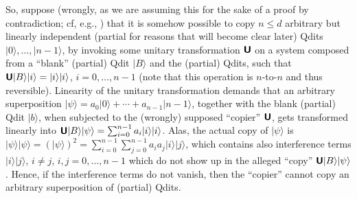 \documentclass[%
  preprint,
 showpacs,
 showkeys,
 preprintnumbers,
 amsmath,amssymb,
 aps,
   pra,
  longbibliography,
 ]{revtex4-1}
\begin{document}
So, suppose (wrongly, as we are assuming this for the sake of a proof by contradiction; cf, e.g.,
\cite[pp.~39-40]{mermin-04} )
that it is somehow possible to copy $n\le d$ arbitrary but linearly independent (partial for reasons that will become clear later) Qdits
$\vert 0 \rangle , \ldots , \vert n-1 \rangle $,
by invoking some unitary transformation
$\textsf{\textbf{U}}$ on a system composed from a ``blank'' (partial) Qdit
$\vert B \rangle $ and the (partial) Qdits, such that
$\textsf{\textbf{U}}  \vert B \rangle \vert i \rangle    = \vert i \rangle \vert i \rangle $, $i=0,\ldots , n-1$
(note that this operation is $n$-to-$n$ and thus reversible).
Linearity of the unitary transformation demands that an arbitrary superposition
$\vert \psi  \rangle = a_0\vert 0 \rangle + \cdots + a_{n-1}\vert n-1 \rangle $,
together with the blank (partial) Qdit
$\vert b \rangle $,
when subjected to the (wrongly) supposed ``copier'' $\textsf{\textbf{U}}$,
gets transformed linearly into
$\textsf{\textbf{U}}  \vert B \rangle \vert \psi \rangle    = \sum_{i=0}^{n-1} a_i \vert i \rangle \vert i \rangle $.
Alas, the actual copy of
$\vert \psi  \rangle$
is
$\vert \psi  \rangle \vert \psi  \rangle = (\vert \psi  \rangle)^2
 = \sum_{i=0}^{n-1} \sum_{j=0}^{n-1} a_i  a_j \vert i \rangle \vert j \rangle
$, which contains also interference terms
$\vert i  \rangle \vert j  \rangle$, $i\neq j$,  $i,j=0,\ldots , n-1$
which do not show up in the alleged ``copy'' $\textsf{\textbf{U}}  \vert B \rangle \vert \psi \rangle    $.
Hence, if the interference terms do not vanish, then the  ``copier'' cannot copy an arbitrary superposition of (partial) Qdits.
\end{document}
